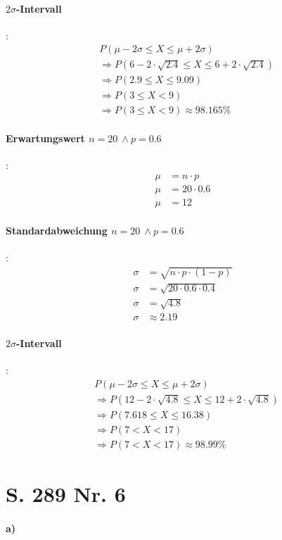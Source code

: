 \documentclass[12pt,a4paper]{report}
\begin{document}
	\paragraph{$2\sigma$-Intervall}:
	\begin{align*}
		&P(\mu - 2\sigma \leq X \leq \mu + 2\sigma) \\
		&\Rightarrow P(6 - 2\cdot \sqrt{2.4} \leq X \leq 6 + 2\cdot\sqrt{2.4}) \\
		&\Rightarrow P(2.9 \leq X \leq 9.09) \\
		&\Rightarrow P(3 \leq X < 9) \\
		&\Rightarrow P(3 \leq X < 9) \approx 98.165 \%
	\end{align*}
	\paragraph{Erwartungswert $n=20\ \land p=0.6$}:
	\begin{align*}
		\mu &= n\cdot p \\
		\mu &= 20 \cdot 0.6 \\
		\mu &= 12
	\end{align*}
	\paragraph{Standardabweichung $n=20\ \land p=0.6$}:
	\begin{align*}
		\sigma &= \sqrt{n\cdot p\cdot(1-p)} \\
		\sigma &= \sqrt{20 \cdot 0.6 \cdot 0.4} \\
		\sigma &= \sqrt{4.8} \\
		\sigma &\approx 2.19
	\end{align*}
	\paragraph{$2\sigma$-Intervall}:
	\begin{align*}
		&P(\mu - 2\sigma \leq X \leq \mu + 2\sigma) \\
		&\Rightarrow P(12 - 2\cdot \sqrt{4.8} \leq X \leq 12 + 2\cdot \sqrt{4.8}) \\
		&\Rightarrow P(7.618 \leq X \leq 16.38) \\
		&\Rightarrow P(7 < X < 17) \\
		&\Rightarrow P(7< X < 17) \approx 98.99 \%
	\end{align*}
	\section{S. 289 Nr. 6}
	\paragraph{a)}
\end{document}
